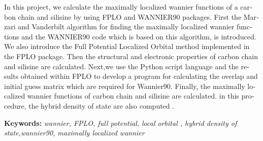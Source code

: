 \begin{latin}
\singlespace
\thispagestyle{empty}
\begin{center}
\begin{minipage}{.8\textwidth}
In this project, we calculate the maximally localized wannier functions of a carbon chain and silisine by using FPLO and WANNIER90 packages. First the Marzari and Vanderbilt algorithm for finding the maximally localized wannier functions and the WANNIER90 code which is based on this algorithm, is introduced. We also introduce the Full Potential Localized Orbital method implemented in the FPLO package. Then the structural and electronic properties of carbon chain and  silisine are calculated. Next,we use the Python script language and the results obtained within FPLO to develop a program for calculating the overlap and initial guess matrix which are required for Wannier90. Finally, the maximally localized wannier functions of carbon chain and silisine are calculated. in this procedure, the hybrid density of state are also computed . 
\\
\end{minipage}
\end{center}
\textbf{Keywords:} {\it wannier, FPLO, full potential, local orbital , hybrid density of state,wannier90, maximally localized wannier}
\end{latin}

